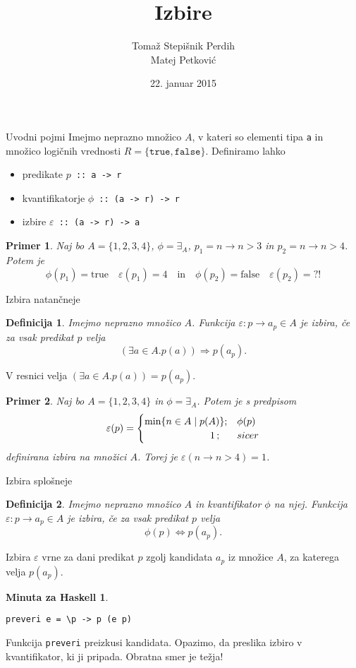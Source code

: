 \documentclass{beamer}
\author[Sintaktična sladkorčka]{Tomaž Stepišnik Perdih\\  Matej Petković}
\title{Izbire}
\date{{22. januar 2015}}
\newtheorem{defin}{Definicija}
\newtheorem{koda}{Minuta za Haskell}
\newtheorem{prim}{Primer}
\def\eps{\varepsilon}
\def\obs{\exists}
\begin{document}
\begin{frame}
\titlepage 
\end{frame}

\begin{frame}{Uvodni pojmi}
Imejmo neprazno množico $A$, v kateri so elementi tipa \texttt{a}  in množico logičnih vrednosti $R =  \{ \texttt{true}, \texttt{false}\} $. Definiramo lahko
\begin{itemize}
\item predikate\; $p$\texttt{ :: a -> r}
\item kvantifikatorje\; $\phi$\texttt{ :: (a -> r) -> r}
\item izbire $\varepsilon$\texttt{ :: (a -> r) -> a}
\end{itemize}



\begin{prim}
Naj bo $A = \{1,2,3,4\}$, $\phi = \exists_A$, $p_1 = n \to n > 3$ in $p_2 = n\to n > 4$. Potem je
$$\phi(p_1) = \text{true}\quad\varepsilon (p_1) = 4\quad\text{in}\quad\phi(p_2) = \text{false}\quad\varepsilon (p_2) = \text{?!}$$
\end{prim}

\end{frame}

\begin{frame}{Izbira natančneje}
\begin{defin}
Imejmo neprazno množico $A$. Funkcija $\eps: p \to a_p\in A$ je izbira, če za vsak predikat $p$ velja
$$\left(\obs a\in A. p(a)\right) \Longrightarrow p(a_p)\text{.}$$
\end{defin}
V resnici velja $\left(\obs a\in A. p(a)\right) = p(a_p)$.
\pause
\begin{prim}
Naj bo $A = \{1,2,3,4\}$ in $\phi = \exists_A$. Potem je s predpisom
$$\eps (p) =
\begin{cases}
\min \{ n \in A \mid p(A) \} ;& \phi(p)\\
\hphantom{oooooooooioooo}1\, ;& sicer
\end{cases}
$$
definirana izbira na množici $A$. Torej je $\eps (n \to n > 4) = 1$.
\end{prim}

\end{frame}

\begin{frame}[fragile]{Izbira splošneje}%
\begin{defin}
Imejmo neprazno množico $A$ in kvantifikator $\phi$ na njej. Funkcija $\eps: p \to a_p\in A$ je izbira, če za vsak predikat $p$ velja
$$\phi (p) \Longleftrightarrow p(a_p)\text{.}$$
\end{defin}

Izbira $\eps$ vrne za dani predikat $p$ zgolj kandidata $a_p$ iz množice $A$, za katerega velja $p(a_p)$.
\pause
\begin{koda}
\begin{verbatim}
preveri e = \p -> p (e p)
\end{verbatim}
\end{koda}
Funkcija \texttt{preveri} preizkusi kandidata. Opazimo, da preslika izbiro v kvantifikator, ki ji pripada. Obratna smer je težja!
\end{frame}
\end{document}

